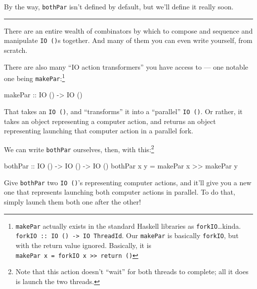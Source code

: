 \documentclass[]{article}
\newenvironment{Shaded}{}{}
\newcommand{\DataTypeTok}[1]{\textcolor[rgb]{0.56,0.13,0.00}{{#1}}}
\newcommand{\OtherTok}[1]{\textcolor[rgb]{0.00,0.44,0.13}{{#1}}}
\newcommand{\FunctionTok}[1]{\textcolor[rgb]{0.02,0.16,0.49}{{#1}}}
\newcommand{\NormalTok}[1]{{#1}}
\begin{document}
By the way, \texttt{bothPar} isn't defined by default, but we'll define it
really soon.

\begin{center}\rule{0.5\linewidth}{\linethickness}\end{center}

There are an entire wealth of combinators by which to compose and sequence and
manipulate \texttt{IO\ ()}s together. And many of them you can even write
yourself, from scratch.

There are also many ``IO action transformers'' you have access to --- one
notable one being \texttt{makePar}:\footnote{\texttt{makePar} actually exists in
  the standard Haskell libraries as \texttt{forkIO}\ldots{}kinda.
  \texttt{forkIO\ ::\ IO\ ()\ -\textgreater{}\ IO\ ThreadId}. Our
  \texttt{makePar} is basically \texttt{forkIO}, but with the return value
  ignored. Basically, it is
  \texttt{makePar\ x\ =\ forkIO\ x\ \textgreater{}\textgreater{}\ return\ ()}}

\begin{Shaded}
\begin{Highlighting}[]
\OtherTok{makePar ::} \DataTypeTok{IO} \NormalTok{() }\OtherTok{->} \DataTypeTok{IO} \NormalTok{()}
\end{Highlighting}
\end{Shaded}

That takes an \texttt{IO\ ()}, and ``transforms'' it into a ``parallel''
\texttt{IO\ ()}. Or rather, it takes an object representing a computer action,
and returns an object representing launching that computer action in a parallel
fork.

We can write \texttt{bothPar} ourselves, then, with this:\footnote{Note that
  this action doesn't ``wait'' for both threads to complete; all it does is
  launch the two threads.}

\begin{Shaded}
\begin{Highlighting}[]
\OtherTok{bothPar ::} \DataTypeTok{IO} \NormalTok{() }\OtherTok{->} \DataTypeTok{IO} \NormalTok{() }\OtherTok{->} \DataTypeTok{IO} \NormalTok{()}
\NormalTok{bothPar x y }\FunctionTok{=} \NormalTok{makePar x }\FunctionTok{>>} \NormalTok{makePar y}
\end{Highlighting}
\end{Shaded}

Give \texttt{bothPar} two \texttt{IO\ ()}'s representing computer actions, and
it'll give you a new one that represents launching both computer actions in
parallel. To do that, simply launch them both one after the other!
\end{document}
